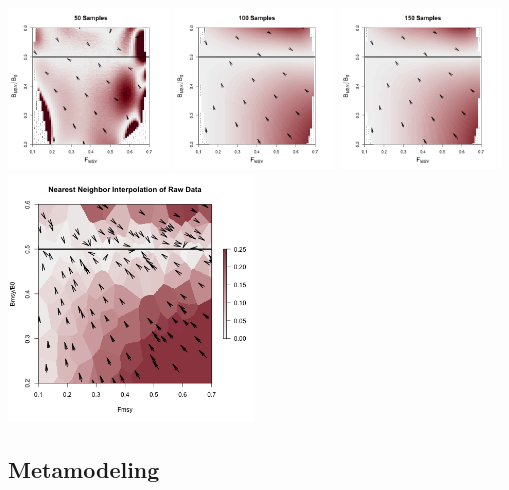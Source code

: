 \includegraphics[width=0.32\textwidth]{../edits/directionalBiasSubPTFlatT30nF6.png}%
\includegraphics[width=0.32\textwidth]{../edits/directionalBiasSubPTFlatT30nF3.png}
\includegraphics[width=0.32\textwidth]{../edits/directionalBiasSubPTFlatT30nF1.png}\\
\includegraphics[width=0.49\textwidth]{../edits/obsDirectionalBiasSubFlatT30nF1.png}


\subsection{Metamodeling}

